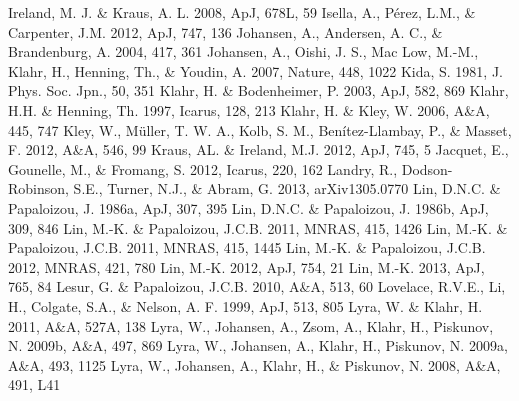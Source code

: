 \documentclass[apj]{emulateapj}
\begin{document}
\begin{thebibliography}{}
 Ireland, M. J. \& Kraus, A. L. 2008, ApJ, 678L, 59
 Isella, A., P\'erez, L.M., \& Carpenter, J.M. 2012, ApJ, 747, 136
 Johansen, A., Andersen, A. C., \& Brandenburg, A. 2004, 417, 361
 Johansen, A., Oishi, J. S., Mac Low, M.-M., Klahr, H., Henning, Th., \& Youdin, A. 2007, Nature, 448, 1022
 Kida, S. 1981, J. Phys. Soc. Jpn., 50, 351
 Klahr, H. \& Bodenheimer, P. 2003, ApJ, 582, 869
 Klahr, H.H. \& Henning, Th. 1997, Icarus, 128, 213
 Klahr, H. \& Kley, W. 2006, A\&A, 445, 747
 Kley, W., M\"uller, T. W. A., Kolb, S. M., Ben\'itez-Llambay, P., \& Masset, F. 2012, A\&A, 546, 99
 Kraus, AL. \& Ireland, M.J. 2012, ApJ, 745, 5
 Jacquet, E., Gounelle, M., \& Fromang, S. 2012, Icarus, 220, 162
 Landry, R., Dodson-Robinson, S.E., Turner, N.J., \& Abram, G. 2013, arXiv1305.0770
 Lin, D.N.C. \& Papaloizou, J. 1986a, ApJ, 307, 395
 Lin, D.N.C. \& Papaloizou, J. 1986b, ApJ, 309, 846
 Lin, M.-K. \& Papaloizou, J.C.B. 2011, MNRAS, 415, 1426
 Lin, M.-K. \& Papaloizou, J.C.B. 2011, MNRAS, 415, 1445
 Lin, M.-K. \& Papaloizou, J.C.B. 2012, MNRAS, 421, 780
 Lin, M.-K. 2012, ApJ, 754, 21
 Lin, M.-K. 2013, ApJ, 765, 84
 Lesur, G. \& Papaloizou, J.C.B. 2010, A\&A, 513, 60
 Lovelace, R.V.E., Li, H., Colgate, S.A., \& Nelson, A. F. 1999, ApJ, 513, 805
 Lyra, W. \& Klahr,  H. 2011, A\&A, 527A, 138
 Lyra, W., Johansen, A., Zsom, A., Klahr, H., Piskunov, N. 2009b, A\&A, 497, 869
 Lyra, W., Johansen, A., Klahr, H., Piskunov, N. 2009a, A\&A, 493, 1125 
 Lyra, W., Johansen, A., Klahr, H., \& Piskunov, N. 2008, A\&A, 491, L41

\end{thebibliography}
\end{document}
